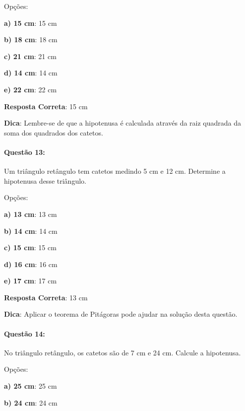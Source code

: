 \documentclass{article}
\begin{document}
\vspace{\baselineskip}Opções:

\vspace{\baselineskip}\textbf{a) 15 cm}: 15 cm 

\textbf{b) 18 cm}: 18 cm 

\textbf{c) 21 cm}: 21 cm 

\textbf{d) 14 cm}: 14 cm 

\textbf{e) 22 cm}: 22 cm 

\vspace{\baselineskip}\textbf{Resposta Correta}: 15 cm

\vspace{\baselineskip}\textbf{Dica}: Lembre-se de que a hipotenusa é calculada através da raiz quadrada da soma dos quadrados dos catetos.

\paragraph{Questão 13:}
{Um triângulo retângulo tem catetos medindo 5 cm e 12 cm. Determine a hipotenusa desse triângulo.}

\vspace{\baselineskip}Opções:

\vspace{\baselineskip}\textbf{a) 13 cm}: 13 cm 

\textbf{b) 14 cm}: 14 cm 

\textbf{c) 15 cm}: 15 cm 

\textbf{d) 16 cm}: 16 cm 

\textbf{e) 17 cm}: 17 cm 

\vspace{\baselineskip}\textbf{Resposta Correta}: 13 cm

\vspace{\baselineskip}\textbf{Dica}: Aplicar o teorema de Pitágoras pode ajudar na solução desta questão.

\paragraph{Questão 14:}
{No triângulo retângulo, os catetos são de 7 cm e 24 cm. Calcule a hipotenusa.}

\vspace{\baselineskip}Opções:

\vspace{\baselineskip}\textbf{a) 25 cm}: 25 cm 

\textbf{b) 24 cm}: 24 cm 
\end{document}
